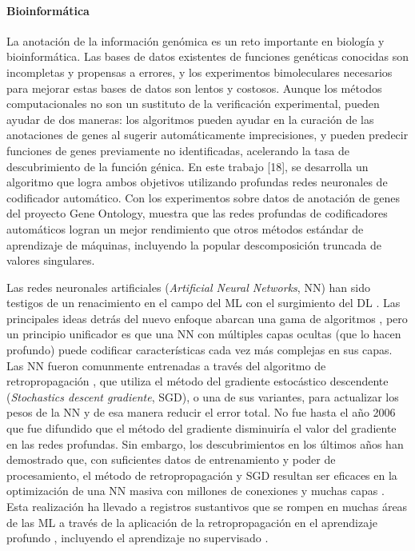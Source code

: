 \paragraph{Bioinformática} La anotación de la información genómica es un reto importante en biología y bioinformática. Las bases de datos existentes de funciones genéticas conocidas son incompletas y propensas a errores, y los experimentos bimoleculares necesarios para mejorar estas bases de datos son lentos y costosos. Aunque los métodos computacionales no son un sustituto de la verificación experimental, pueden ayudar de dos maneras: los algoritmos pueden ayudar en la curación de las anotaciones de genes al sugerir automáticamente imprecisiones, y pueden predecir funciones de genes previamente no identificadas, acelerando la tasa de descubrimiento de la función génica. En este trabajo [18], se desarrolla un algoritmo que logra ambos objetivos utilizando profundas redes neuronales de codificador automático. Con los experimentos sobre datos de anotación de genes del proyecto Gene Ontology, muestra que las redes profundas de codificadores automáticos logran un mejor rendimiento que otros métodos estándar de aprendizaje de máquinas, incluyendo la popular descomposición truncada de valores singulares.


Las redes neuronales artificiales ({\em Artificial Neural Networks}, NN) han sido testigos de un renacimiento en el campo del ML con el surgimiento del DL \cite{Bengio2006, Hinton2006, Le2012, Ranzato2007}. Las principales ideas detrás del nuevo enfoque abarcan una gama de algoritmos \cite{Bengio2007, Hinton2006}, pero un principio unificador es que una NN con múltiples capas ocultas (que lo hacen profundo) puede codificar características cada vez más complejas en sus capas. Las NN fueron comunmente entrenadas a través del algoritmo de retropropagación \cite{Rumelhart1986b}, que utiliza el método del gradiente estocástico descendente ({\em Stochastics descent gradiente}, SGD), o una de sus variantes, para actualizar los pesos de la NN y de esa manera reducir el error total. No fue hasta el año 2006 que fue difundido que el método del gradiente disminuiría el valor del gradiente en las redes profundas. Sin embargo, los descubrimientos en los últimos años han demostrado que, con suficientes datos de entrenamiento y poder de procesamiento, el método de retropropagación y SGD resultan ser eficaces en la optimización de una NN masiva con millones de conexiones y muchas capas \cite{Ciresan2012, He2015, Le2012}. Esta realización ha llevado a registros sustantivos que se rompen en muchas áreas de las ML a través de la aplicación de la retropropagación en el aprendizaje profundo \cite{Ciresan2012, He2015, Le2012}, incluyendo el aprendizaje no supervisado \cite{Bengio2009}.





